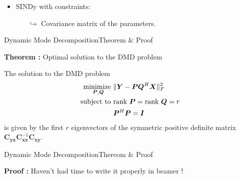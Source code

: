 \begin{frame}[t, c]{}{}
\begin{minipage}{.48\textwidth}
\begin{itemize}
      \medskip
      
    \item SINDy with constraints:
      \begin{itemize}
      \item[\(	\hookrightarrow \)] Covariance matrix of the parameters.
      \end{itemize}
      
    \end{itemize}
    
  \end{minipage}
\end{frame}

\begin{frame}[t, c]{Dynamic Mode Decomposition}{Theorem \& Proof}
  \begin{block}{\textbf{Theorem :} Optimal solution to the DMD problem}
  \end{block}

  \medskip
  
  The solution to the DMD problem
  $$
  \begin{aligned}
    \operatorname*{minimize~}_{\bm{P}, \bm{Q}} & \| \bm{Y} - \bm{PQ}^H \bm{X} \|_F^2 \\
    \operatorname*{subject~to~} & \text{rank } \bm{P} = \text{rank } \bm{Q} = r \\
    & \bm{P}^H \bm{P} = \bm{I}
  \end{aligned}
  $$
  is given by the first $r$ eigenvectors of the symmetric positive definite matrix $\bm{C}_{\bm{yx}} \bm{C}_{\bm{xx}}^{-1} \bm{C}_{\bm{xy}}$.

  \vspace{1cm}
\end{frame}

\begin{frame}[t, c]{Dynamic Mode Decomposition}{Thereom \& Proof}
  \begin{block}{\textbf{Proof :} Haven't had time to write it properly in beamer !}
  \end{block}

  \medskip

  
\end{frame}

